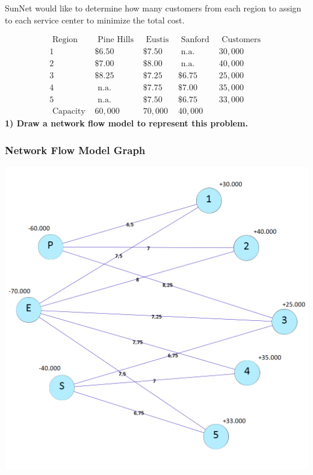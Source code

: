\documentclass[]{article}
\begin{document}
SunNet would like to determine how many customers from each region to
assign to each service center to minimize the total cost.

\[
\begin{array}{lllll}
\text { Region } & \text { Pine Hills } & \text { Eustis } & \text { Sanford } & \text { Customers } \\ 
1 & \$ 6.50 & \$ 7.50 & \text { n.a. } & 30,000 \\ 
2 & \$ 7.00 & \$ 8.00 & \text { n.a. } & 40,000 \\ 
3 & \$ 8.25 & \$ 7.25 & \$ 6.75 & 25,000 \\ 
4 & \text { n.a. } & \$ 7.75 & \$ 7.00 & 35,000 \\ 
5 & \text { n.a. } & \$ 7.50 & \$ 6.75 & 33,000 \\ 
\hline
\text { Capacity } & 60,000 & 70,000 & 40,000 & 
\end{array}
\] \textbf{1) Draw a network flow model to represent this problem.}

\hypertarget{network-flow-model-graph}{%
\subsubsection{Network Flow Model
Graph}\label{network-flow-model-graph}}

\includegraphics{graph.png}
\end{document}
